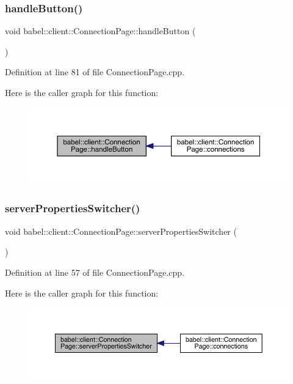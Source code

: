 \subsubsection{\texorpdfstring{handle\+Button()}{handleButton()}}
{\footnotesize\ttfamily void babel\+::client\+::\+Connection\+Page\+::handle\+Button (\begin{DoxyParamCaption}{ }\end{DoxyParamCaption})}



Definition at line 81 of file Connection\+Page.\+cpp.

Here is the caller graph for this function\+:\nopagebreak
\begin{figure}[H]
\begin{center}
\leavevmode
\includegraphics[width=350pt]{classbabel_1_1client_1_1_connection_page_a7426b5a671ce9de0827690a601ac0be8_icgraph}
\end{center}
\end{figure}
\mbox{\label{classbabel_1_1client_1_1_connection_page_adc6492dc0013dcf2ecd28ec6a370d5d4}} 
\subsubsection{\texorpdfstring{server\+Properties\+Switcher()}{serverPropertiesSwitcher()}}
{\footnotesize\ttfamily void babel\+::client\+::\+Connection\+Page\+::server\+Properties\+Switcher (\begin{DoxyParamCaption}{ }\end{DoxyParamCaption})}



Definition at line 57 of file Connection\+Page.\+cpp.

Here is the caller graph for this function\+:\nopagebreak
\begin{figure}[H]
\begin{center}
\leavevmode
\includegraphics[width=350pt]{classbabel_1_1client_1_1_connection_page_adc6492dc0013dcf2ecd28ec6a370d5d4_icgraph}
\end{center}
\end{figure}


